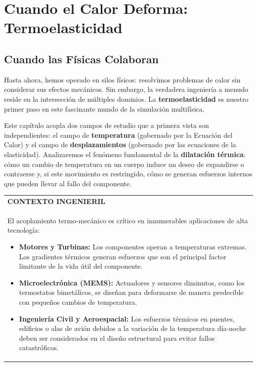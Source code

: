 \chapter{Cuando el Calor Deforma: Termoelasticidad}
\label{chap:thermo}

\section{Cuando las Físicas Colaboran}

Hasta ahora, hemos operado en silos físicos: resolvimos problemas de calor sin considerar sus efectos mecánicos. Sin embargo, la verdadera ingeniería a menudo reside en la intersección de múltiples dominios. La \textbf{termoelasticidad} es nuestro primer paso en este fascinante mundo de la simulación multifísica.

Este capítulo acopla dos campos de estudio que a primera vista son independientes: el campo de \textbf{temperatura} (gobernado por la Ecuación del Calor) y el campo de \textbf{desplazamientos} (gobernado por las ecuaciones de la elasticidad). Analizaremos el fenómeno fundamental de la \textbf{dilatación térmica}: cómo un cambio de temperatura en un cuerpo induce un deseo de expandirse o contraerse y, si este movimiento es restringido, cómo se generan esfuerzos internos que pueden llevar al fallo del componente.

\begin{center}
\begin{tabular}{|p{}|}
\hline
\textbf{CONTEXTO INGENIERIL} \\
El acoplamiento termo-mecánico es crítico en innumerables aplicaciones de alta tecnología:
\begin{itemize}
    \item \textbf{Motores y Turbinas:} Los componentes operan a temperaturas extremas. Los gradientes térmicos generan esfuerzos que son el principal factor limitante de la vida útil del componente.
    \item \textbf{Microelectrónica (MEMS):} Actuadores y sensores diminutos, como los termostatos bimetálicos, se diseñan para deformarse de manera predecible con pequeños cambios de temperatura.
    \item \textbf{Ingeniería Civil y Aeroespacial:} Los esfuerzos térmicos en puentes, edificios o alas de avión debidos a la variación de la temperatura día-noche deben ser considerados en el diseño estructural para evitar fallos catastróficos.
\end{itemize}
\\
\hline
\end{tabular}
\end{center}

